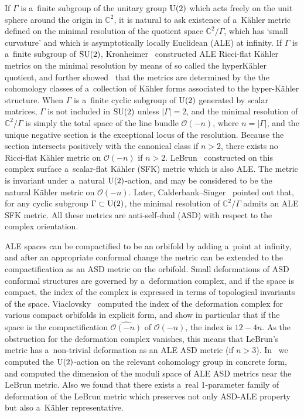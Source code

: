 \documentclass[pdftex]{sigma}
\numberwithin{equation}{section}
\begin{document}
If $\Gamma$ is a~f\/inite subgroup of the unitary group ${\rm{U}}(2)$ which acts freely on the unit sphere around the
origin in $\mathbb{C}^2$, it is natural to ask existence of a~K\"ahler metric def\/ined on the minimal resolution of the
quotient space $\mathbb{C}^2/\Gamma$, which has `small curvature' and which is asymptotically locally Euclidean (ALE) at
inf\/inity.
If $\Gamma$ is a~f\/inite subgroup of ${\rm{SU}}(2)$, Kronheimer~\cite{Kr89a} constructed ALE Ricci-f\/lat K\"ahler
metrics on the minimal resolution by means of so called the hyperK\"ahler quotient, and further showed~\cite{Kr89b} that
the metrics are determined by the the cohomology classes of a~collection of K\"ahler forms associated to the
hyper-K\"ahler structure.
When $\Gamma$ is a~f\/inite cyclic subgroup of ${\rm{U}}(2)$ generated by scalar matrices, $\Gamma$ is not included in
${\rm{SU}}(2)$ unless $|\Gamma|=2$, and the minimal resolution of $\mathbb{C}^2/\Gamma$ is simply the total space of the
line bundle $\mathscr O(-n)$, where $n=|\Gamma|$, and the unique negative section is the exceptional locus of the
resolution.
Because the section intersects positively with the canonical class if $n>2$, there exists no Ricci-f\/lat K\"ahler
metric on $\mathscr O(-n)$ if $n>2$.
LeBrun~\cite{LB88} constructed on this complex surface a~scalar-f\/lat K\"ahler (SFK) metric which is also ALE.
The metric is invariant under a~natural ${\rm{U}}(2)$-action, and may be considered to be the natural K\"ahler metric on
$\mathscr O(-n)$.
Later, Calderbank--Singer~\cite{CS2004} pointed out that, for any cyclic subgroup $\Gamma\subset {\rm{U}}(2)$, the
minimal resolution of $\mathbb{C}^2/\Gamma$ admits an ALE SFK metric.
All these metrics are anti-self-dual (ASD) with respect to the complex orientation.

ALE spaces can be compactif\/ied to be an orbifold by adding a~point at inf\/inity, and after an appropriate conformal
change the metric can be extended to the compactif\/ication as an ASD metric on the orbifold.
Small deformations of ASD conformal structures are governed by a~deformation complex, and if the space is compact, the
index of the complex is expressed in terms of topological invariants of the space.
Viaclovsky~\cite{V} computed the index of the deformation complex for various compact orbifolds in explicit form, and
show in particular that if the space is the compactif\/ication $\widehat{\mathscr O(-n)}$ of $\mathscr O(-n)$, the index
is $12-4n$.
As the obstruction for the deformation complex vanishes, this means that LeBrun's metric has a~non-trivial deformation
as an ALE ASD metric (if $n>3$).
In~\cite{HonCMP2} we computed the ${\rm{U}}(2)$-action on the relevant cohomology group in concrete form, and computed
the dimension of the moduli space of ALE ASD metrics near the LeBrun metric.
Also we found that there exists a~real 1-parameter family of deformation of the LeBrun metric which preserves not only
ASD-ALE property but also a~K\"ahler representative.
\end{document}
